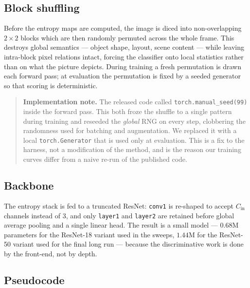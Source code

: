 \subsection{Block shuffling}

Before the entropy maps are computed, the image is diced into non-overlapping
$2\times2$ blocks which are then randomly permuted across the whole frame. This
destroys global semantics --- object shape, layout, scene content --- while
leaving intra-block pixel relations intact, forcing the classifier onto local
statistics rather than on what the picture depicts. During training a fresh
permutation is drawn each forward pass; at evaluation the permutation is fixed
by a seeded generator so that scoring is deterministic.

\begin{quote}\small
\textbf{Implementation note.} The released code called
\texttt{torch.manual\_seed(99)} inside the forward pass. This both froze the
shuffle to a single pattern during training and reseeded the \emph{global} RNG
on every step, clobbering the randomness used for batching and augmentation. We
replaced it with a local \texttt{torch.Generator} that is used only at
evaluation. This is a fix to the harness, not a modification of the method,
and is the reason our training curves differ from a naive re-run of the
published code.
\end{quote}

\subsection{Backbone}

The entropy stack is fed to a truncated ResNet: \texttt{conv1} is re-shaped to
accept $C_{\text{in}}$ channels instead of $3$, and only \texttt{layer1} and
\texttt{layer2} are retained before global average pooling and a single linear
head. The result is a small model --- $0.68$M parameters for the ResNet-18
variant used in the sweeps, $1.44$M for the ResNet-50 variant used for the final
long run --- because the discriminative work is done by the front-end, not by
depth.

\subsection{Pseudocode}

